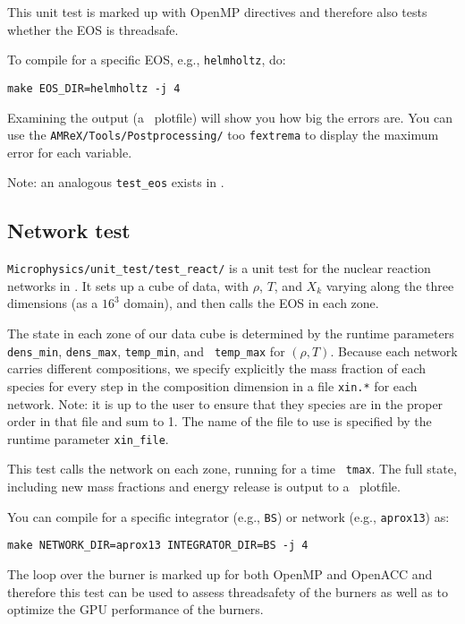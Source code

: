 This unit test is marked up with OpenMP directives and therefore also
tests whether the EOS is threadsafe.

To compile for a specific EOS, e.g., {\tt helmholtz}, do:
\begin{verbatim}
make EOS_DIR=helmholtz -j 4
\end{verbatim}

Examining the output (a \amrex\ plotfile) will show you how big the
errors are.  You can use the {\tt AMReX/Tools/Postprocessing/} too
{\tt fextrema} to display the maximum error for each variable.

Note: an analogous {\tt test\_eos} exists in \maestro.

\subsection{Network test}

{\tt Microphysics/unit\_test/test\_react/} is a unit test for the
nuclear reaction networks in \microphysics.  It sets up a cube of
data, with $\rho$, $T$, and $X_k$ varying along the three dimensions
(as a $16^3$ domain), and then calls the EOS in each zone.  

The state in each zone of our data cube is determined by the runtime
parameters {\tt dens\_min}, {\tt dens\_max}, {\tt temp\_min}, and {\tt
  temp\_max} for $(\rho, T)$.  Because each network carries different
compositions, we specify explicitly the mass fraction of each species
for every step in the composition dimension in a file {\tt xin.*} for
each network.  Note: it is up to the user to ensure that they species
are in the proper order in that file and sum to 1.  The name of the
file to use is specified by the runtime parameter {\tt xin\_file}.

This test calls the network on each zone, running for a time {\tt
  tmax}.  The full state, including new mass fractions and energy
release is output to a \amrex\ plotfile.

You can compile for a specific integrator (e.g., {\tt BS}) or 
network (e.g., {\tt aprox13}) as:
\begin{verbatim}
make NETWORK_DIR=aprox13 INTEGRATOR_DIR=BS -j 4
\end{verbatim}

The loop over the burner is marked up for both OpenMP and OpenACC and
therefore this test can be used to assess threadsafety of the burners
as well as to optimize the GPU performance of the burners.



